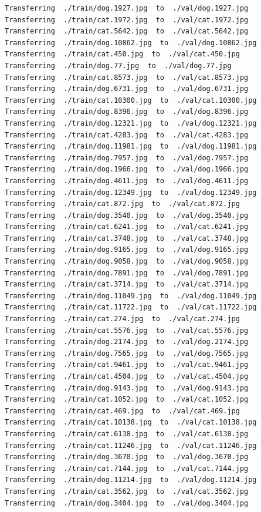 \documentclass[]{book}
\theoremstyle{definition}
\theoremstyle{definition}
\theoremstyle{definition}
\theoremstyle{remark}
\begin{document}
\begin{verbatim}
Transferring  ./train/dog.1927.jpg  to  ./val/dog.1927.jpg
Transferring  ./train/cat.1972.jpg  to  ./val/cat.1972.jpg
Transferring  ./train/cat.5642.jpg  to  ./val/cat.5642.jpg
Transferring  ./train/dog.10862.jpg  to  ./val/dog.10862.jpg
Transferring  ./train/cat.450.jpg  to  ./val/cat.450.jpg
Transferring  ./train/dog.77.jpg  to  ./val/dog.77.jpg
Transferring  ./train/cat.8573.jpg  to  ./val/cat.8573.jpg
Transferring  ./train/dog.6731.jpg  to  ./val/dog.6731.jpg
Transferring  ./train/cat.10300.jpg  to  ./val/cat.10300.jpg
Transferring  ./train/dog.8396.jpg  to  ./val/dog.8396.jpg
Transferring  ./train/dog.12321.jpg  to  ./val/dog.12321.jpg
Transferring  ./train/cat.4283.jpg  to  ./val/cat.4283.jpg
Transferring  ./train/dog.11981.jpg  to  ./val/dog.11981.jpg
Transferring  ./train/dog.7957.jpg  to  ./val/dog.7957.jpg
Transferring  ./train/dog.1966.jpg  to  ./val/dog.1966.jpg
Transferring  ./train/dog.4611.jpg  to  ./val/dog.4611.jpg
Transferring  ./train/dog.12349.jpg  to  ./val/dog.12349.jpg
Transferring  ./train/cat.872.jpg  to  ./val/cat.872.jpg
Transferring  ./train/dog.3540.jpg  to  ./val/dog.3540.jpg
Transferring  ./train/cat.6241.jpg  to  ./val/cat.6241.jpg
Transferring  ./train/cat.3748.jpg  to  ./val/cat.3748.jpg
Transferring  ./train/dog.9165.jpg  to  ./val/dog.9165.jpg
Transferring  ./train/dog.9058.jpg  to  ./val/dog.9058.jpg
Transferring  ./train/dog.7891.jpg  to  ./val/dog.7891.jpg
Transferring  ./train/cat.3714.jpg  to  ./val/cat.3714.jpg
Transferring  ./train/dog.11049.jpg  to  ./val/dog.11049.jpg
Transferring  ./train/cat.11722.jpg  to  ./val/cat.11722.jpg
Transferring  ./train/cat.274.jpg  to  ./val/cat.274.jpg
Transferring  ./train/cat.5576.jpg  to  ./val/cat.5576.jpg
Transferring  ./train/dog.2174.jpg  to  ./val/dog.2174.jpg
Transferring  ./train/dog.7565.jpg  to  ./val/dog.7565.jpg
Transferring  ./train/cat.9461.jpg  to  ./val/cat.9461.jpg
Transferring  ./train/cat.4504.jpg  to  ./val/cat.4504.jpg
Transferring  ./train/dog.9143.jpg  to  ./val/dog.9143.jpg
Transferring  ./train/cat.1052.jpg  to  ./val/cat.1052.jpg
Transferring  ./train/cat.469.jpg  to  ./val/cat.469.jpg
Transferring  ./train/cat.10138.jpg  to  ./val/cat.10138.jpg
Transferring  ./train/cat.6138.jpg  to  ./val/cat.6138.jpg
Transferring  ./train/cat.11246.jpg  to  ./val/cat.11246.jpg
Transferring  ./train/dog.3670.jpg  to  ./val/dog.3670.jpg
Transferring  ./train/cat.7144.jpg  to  ./val/cat.7144.jpg
Transferring  ./train/dog.11214.jpg  to  ./val/dog.11214.jpg
Transferring  ./train/cat.3562.jpg  to  ./val/cat.3562.jpg
Transferring  ./train/dog.3404.jpg  to  ./val/dog.3404.jpg

\end{verbatim}
\end{document}
